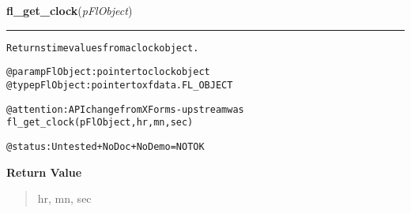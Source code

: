     \label{xformslib:flclock:fl_get_clock}

    \vspace{0.5ex}

\hspace{.8\funcindent}\begin{boxedminipage}{\funcwidth}

    \raggedright \textbf{fl\_get\_clock}(\textit{pFlObject})

    \vspace{-1.5ex}

    \rule{\textwidth}{0.5\fboxrule}
\setlength{\parskip}{2ex}
\begin{alltt}
        Returns time values from a clock object.

        @param pFlObject: pointer to clock object
@type pFlObject: pointer to xfdata.FL\_OBJECT

        @attention: API change from XForms - upstream was
                    fl\_get\_clock(pFlObject, hr, mn, sec)

        @status: Untested + NoDoc + NoDemo = NOT OK
    
\end{alltt}

\setlength{\parskip}{1ex}
      \textbf{Return Value}
    \vspace{-1ex}

      \begin{quote}
      hr, mn, sec

      \end{quote}

    \end{boxedminipage}

    \label{xformslib:flclock:fl_set_clock_adjustment}

    \vspace{0.5ex}

